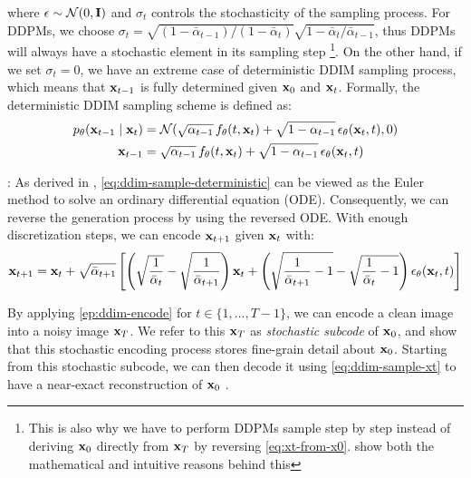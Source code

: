 where $\epsilon \sim {\mathcal{N}}(0, {\mathbf{I}})$ and $\sigma_t$ controls the stochasticity of the sampling process. For \ac{DDPMs}, we choose $\sigma_t = \sqrt{(1 - \bar{\alpha}_{t-1})/(1 - \bar{\alpha}_t)} \sqrt{1 - \bar{\alpha}_t/\bar{\alpha}_{t-1}}$, thus \ac{DDPMs} will always have a stochastic element in its sampling step \footnote{This is also why we have to perform \ac{DDPMs} sample step by step instead of deriving ${\mathbf{x}}_0$ directly from ${\mathbf{x}}_T$ by reversing \cref{eq:xt-from-x0}. \cite{soto2024ddpmLecture} show both the mathematical and intuitive reasons behind this}. On the other hand, if we set $\sigma_t = 0$, we have an extreme case of deterministic DDIM sampling process, which means that ${\mathbf{x}}_{t-1}$ is fully determined given ${\mathbf{x}}_0$ and ${\mathbf{x}}_t$. Formally, the deterministic DDIM sampling scheme is defined as: 
\begin{align}
    p_{\theta}({\mathbf{x}}_{t-1} \mid {\mathbf{x}}_t) &= \mathcal{N} (\sqrt{\alpha_{t-1}} \, f_{\theta}(t, {\mathbf{x}}_t) + \sqrt{1 - \alpha_{t-1}} \, \epsilon_{\theta}({\mathbf{x}}_t, t), 0)\label{eq:ddim-posterior-deterministic} \\
    {\mathbf{x}}_{t-1} &= \sqrt{\alpha_{t-1}} \, f_{\theta}(t, {\mathbf{x}}_t) + \sqrt{1 - \alpha_{t-1}} \, \epsilon_{\theta}({\mathbf{x}}_t, t) \label{eq:ddim-sample-deterministic}
\end{align}

: As derived in \cite{songDDIM}, \cref{eq:ddim-sample-deterministic} can be viewed as the  Euler method to solve an ordinary differential equation (ODE). Consequently,  we can reverse the generation process by using the reversed ODE. With enough discretization steps, we can encode ${\mathbf{x}}_{t+1}$ given ${\mathbf{x}}_t$ with: 
\begin{align}
    {\mathbf{x}}_{t+1} = {\mathbf{x}}_t + \sqrt{\bar\alpha_{t+1}} \left[ \left(\sqrt{\frac{1}{\bar\alpha_t}} - \sqrt{\frac{1}{\bar\alpha_{t+1}}} \right) {\mathbf{x}}_t + \left( \sqrt{\frac{1}{\bar\alpha_{t+1}} - 1} - \sqrt{\frac{1}{\bar\alpha_t} - 1}\right) \epsilon_{\theta} ({\mathbf{x}}_t, t) \right] \label{ep:ddim-encode}
\end{align}

By applying \cref{ep:ddim-encode} for $t \in \{1, ..., T-1\}$, we can encode a clean image into a noisy image ${\mathbf{x}}_T$. We refer to this ${\mathbf{x}}_T$ as \emph{stochastic subcode} of ${\mathbf{x}}_0$, and \cite{DiffAE} show that this stochastic encoding process stores fine-grain detail about ${\mathbf{x}}_0$. Starting from this stochastic subcode, we can then decode it using \cref{eq:ddim-sample-xt} to have a near-exact reconstruction of ${\mathbf{x}}_0$ \cite{DiffAE, lozuponeLDAE2025, wolleb2022DDPM-weaksupervise}.

